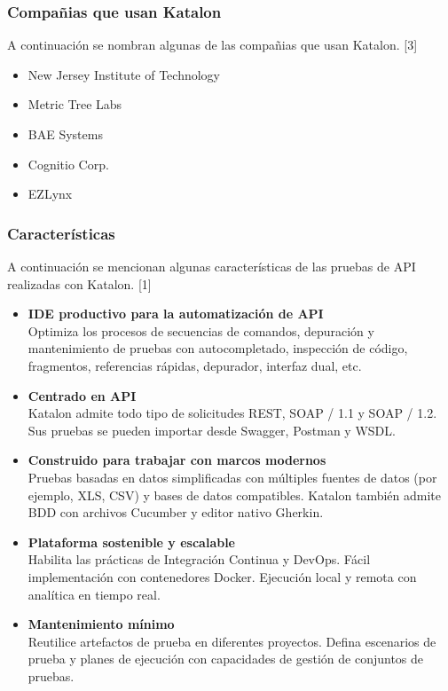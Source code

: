 \documentclass[twoside,twocolumn]{article}
\begin{document}
\subsubsection{Compañias que usan Katalon}

A continuación se nombran algunas de las compañias que usan Katalon. [3]

\begin{itemize}
  \item New Jersey Institute of Technology
  \item Metric Tree Labs
  \item BAE Systems
  \item Cognitio Corp.
  \item EZLynx
\end{itemize}

\subsubsection{Características}

A continuación se mencionan algunas características de las pruebas de API realizadas con Katalon. [1]

\begin{itemize}
  \item \textbf{IDE productivo para la automatización de API} \\
  Optimiza los procesos de secuencias de comandos, depuración y mantenimiento de pruebas con autocompletado, inspección de código, fragmentos, referencias rápidas, depurador, interfaz dual, etc.  
  \item \textbf{Centrado en API} \\
  Katalon admite todo tipo de solicitudes REST, SOAP / 1.1 y SOAP / 1.2. Sus pruebas se pueden importar desde Swagger, Postman y WSDL.
  \item \textbf{Construido para trabajar con marcos modernos} \\
  Pruebas basadas en datos simplificadas con múltiples fuentes de datos (por ejemplo, XLS, CSV) y bases de datos compatibles. Katalon también admite BDD con archivos Cucumber y editor nativo Gherkin.
  \item \textbf{Plataforma sostenible y escalable} \\
  Habilita las prácticas de Integración Continua y DevOps. Fácil implementación con contenedores Docker. Ejecución local y remota con analítica en tiempo real.
  \item \textbf{Mantenimiento mínimo} \\
  Reutilice artefactos de prueba en diferentes proyectos. Defina escenarios de prueba y planes de ejecución con capacidades de gestión de conjuntos de pruebas.
\end{itemize}
\end{document}
